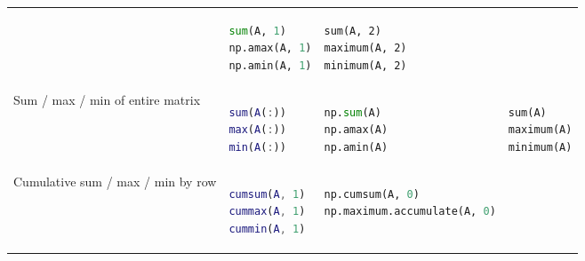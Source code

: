 \documentclass[10pt, landscape]{article}
\begin{document}
\begin{multicols}{2}
\begin{tabular}[]{@{}llll@{}}
\begin{minipage}[t]{0.22\columnwidth}
\strut
\end{minipage} & \begin{minipage}[t]{0.24\columnwidth}\raggedright\strut
\begin{lstlisting}[language=Python]
sum(A, 1)
np.amax(A, 1)
np.amin(A, 1)
\end{lstlisting}
\strut
\end{minipage} & \begin{minipage}[t]{0.20\columnwidth}\raggedright\strut
\begin{lstlisting}
sum(A, 2)
maximum(A, 2)
minimum(A, 2)
\end{lstlisting}
\strut
\end{minipage}\tabularnewline
\begin{minipage}[t]{0.23\columnwidth}\raggedright\strut
Sum / max / min of entire matrix\strut
\end{minipage} & \begin{minipage}[t]{0.22\columnwidth}\raggedright\strut
\begin{lstlisting}[language=Matlab]
sum(A(:))
max(A(:))
min(A(:))
\end{lstlisting}
\strut
\end{minipage} & \begin{minipage}[t]{0.24\columnwidth}\raggedright\strut
\begin{lstlisting}[language=Python]
np.sum(A)
np.amax(A)
np.amin(A)
\end{lstlisting}
\strut
\end{minipage} & \begin{minipage}[t]{0.20\columnwidth}\raggedright\strut
\begin{lstlisting}
sum(A)
maximum(A)
minimum(A)
\end{lstlisting}
\strut
\end{minipage}\tabularnewline
\begin{minipage}[t]{0.23\columnwidth}\raggedright\strut
Cumulative sum / max / min by row\strut
\end{minipage} & \begin{minipage}[t]{0.22\columnwidth}\raggedright\strut
\begin{lstlisting}[language=Matlab]
cumsum(A, 1)
cummax(A, 1)
cummin(A, 1)
\end{lstlisting}
\strut
\end{minipage} & \begin{minipage}[t]{0.24\columnwidth}\raggedright\strut
\begin{lstlisting}[language=Python]
np.cumsum(A, 0)
np.maximum.accumulate(A, 0)

\end{lstlisting}
\end{minipage}
\end{tabular}
\end{multicols}
\end{document}
